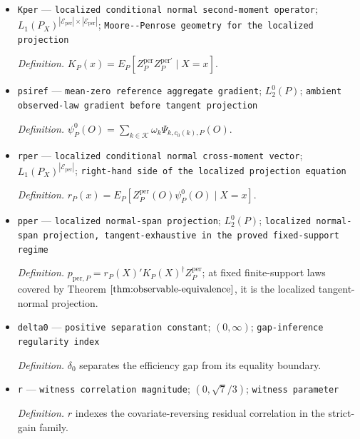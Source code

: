 \documentclass{article}
\begin{document}
\begin{itemize}
  \par\smallskip\noindent\emph{Definition.} \(Z_P^{\mathrm{per}}\) stacks the standardized residual contrasts for the localized clean-through-terminal rows in Definition \(\ref{def:complete-normal-projection}\).
  \item \texttt{Kper} --- \texttt{localized conditional normal second-\allowbreak{}moment operator}; \(L_1(P_X)^{|\mathcal E_{\mathrm{per}}|\times|\mathcal E_{\mathrm{per}}|}\); \texttt{Moore-\allowbreak{}-\allowbreak{}Penrose geometry for the localized projection}
  \par\smallskip\noindent\emph{Definition.} \(K_P(x)=E_P[Z_P^{\mathrm{per}}Z_P^{\mathrm{per}\prime}\mid X=x]\).
  \item \texttt{psiref} --- \texttt{mean-\allowbreak{}zero reference aggregate gradient}; \(L_2^0(P)\); \texttt{ambient observed-\allowbreak{}law gradient before tangent projection}
  \par\smallskip\noindent\emph{Definition.} \(\psi_P^0(O)=\sum_{k\in\mathcal K}\omega_k\Psi_{k,c_0(k),P}(O)\).
  \item \texttt{rper} --- \texttt{localized conditional normal cross-\allowbreak{}moment vector}; \(L_1(P_X)^{|\mathcal E_{\mathrm{per}}|}\); \texttt{right-\allowbreak{}hand side of the localized projection equation}
  \par\smallskip\noindent\emph{Definition.} \(r_P(x)=E_P[Z_P^{\mathrm{per}}(O)\psi_P^0(O)\mid X=x]\).
  \item \texttt{pper} --- \texttt{localized normal-\allowbreak{}span projection}; \(L_2^0(P)\); \texttt{localized normal-\allowbreak{}span projection,\allowbreak{} tangent-\allowbreak{}exhaustive in the proved fixed-\allowbreak{}support regime}
  \par\smallskip\noindent\emph{Definition.} \(p_{\mathrm{per},P}=r_P(X)'K_P(X)^\dagger Z_P^{\mathrm{per}}\); at fixed finite-support laws covered by Theorem \(\ref{thm:observable-equivalence}\), it is the localized tangent-normal projection.
  \item \texttt{delta0} --- \texttt{positive separation constant}; \((0,\infty)\); \texttt{gap-\allowbreak{}inference regularity index}
  \par\smallskip\noindent\emph{Definition.} \(\delta_0\) separates the efficiency gap from its equality boundary.
  \item \texttt{r} --- \texttt{witness correlation magnitude}; \((0,\sqrt 7/3)\); \texttt{witness parameter}
  \par\smallskip\noindent\emph{Definition.} \(r\) indexes the covariate-reversing residual correlation in the strict-gain family.

\end{itemize}
\end{document}
